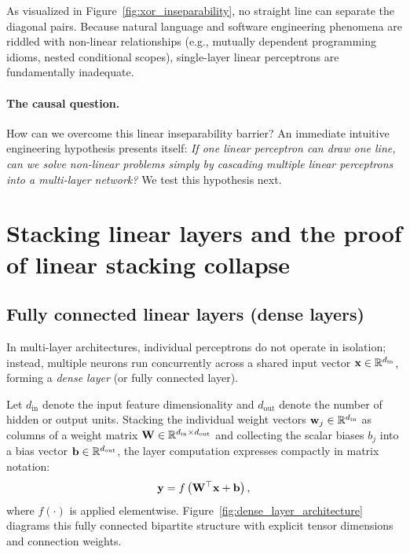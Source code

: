 \documentclass[../../main.tex]{subfiles}
\begin{document}
As visualized in Figure~\ref{fig:xor_inseparability}, no straight line can separate the diagonal pairs. Because natural language and software engineering phenomena are riddled with non-linear relationships (e.g., mutually dependent programming idioms, nested conditional scopes), single-layer linear perceptrons are fundamentally inadequate.

\paragraph{The causal question.}
How can we overcome this linear inseparability barrier? An immediate intuitive engineering hypothesis presents itself: \emph{If one linear perceptron can draw one line, can we solve non-linear problems simply by cascading multiple linear perceptrons into a multi-layer network?} We test this hypothesis next.


\clearpage
\section{Stacking linear layers and the proof of linear stacking collapse}
\label{sec:linear_stacking_collapse}

\subsection{Fully connected linear layers (dense layers)}
In multi-layer architectures, individual perceptrons do not operate in isolation; instead, multiple neurons run concurrently across a shared input vector $\mathbf{x} \in \mathbb{R}^{d_{\text{in}}}$, forming a \emph{dense layer} (or fully connected layer).

Let $d_{\text{in}}$ denote the input feature dimensionality and $d_{\text{out}}$ denote the number of hidden or output units. Stacking the individual weight vectors $\mathbf{w}_j \in \mathbb{R}^{d_{\text{in}}}$ as columns of a weight matrix $\mathbf{W} \in \mathbb{R}^{d_{\text{in}} \times d_{\text{out}}}$ and collecting the scalar biases $b_j$ into a bias vector $\mathbf{b} \in \mathbb{R}^{d_{\text{out}}}$, the layer computation expresses compactly in matrix notation:
\begin{equation}
\label{eq:dense_matrix_layer}
\mathbf{y} = f\left( \mathbf{W}^\top \mathbf{x} + \mathbf{b} \right),
\end{equation}
where $f(\cdot)$ is applied elementwise. Figure~\ref{fig:dense_layer_architecture} diagrams this fully connected bipartite structure with explicit tensor dimensions and connection weights.
\end{document}

